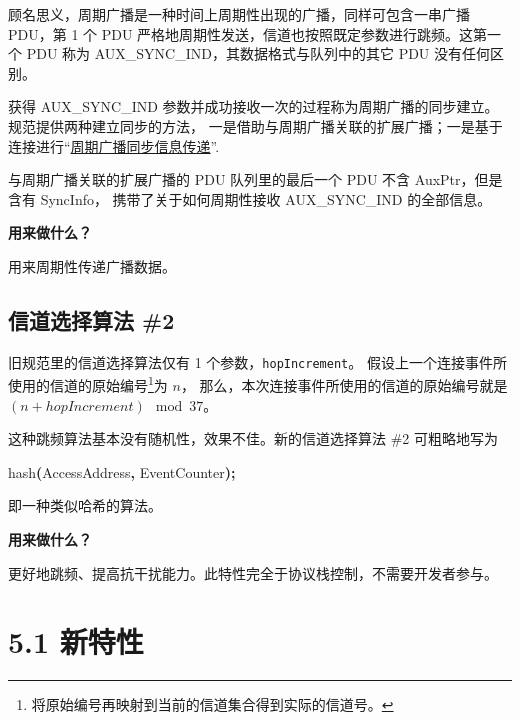 \documentclass[
  12pt,
]{book}
\makeatletter
\newenvironment{Shaded}{\begin{snugshade}}{\end{snugshade}}
\newcommand{\NormalTok}[1]{#1}
\newcommand{\OperatorTok}[1]{\textcolor[rgb]{0.81,0.36,0.00}{\textbf{#1}}}
\newenvironment{kframe}{%
\medskip{}
\setlength{\fboxsep}{.8em}
 \def\at@end@of@kframe{}%
 \ifinner\ifhmode%
  \def\at@end@of@kframe{\end{minipage}}%
  \begin{minipage}{\columnwidth}%
 \fi\fi%
 \def\FrameCommand##1{\hskip\@totalleftmargin \hskip-\fboxsep
 \colorbox{shadecolor}{##1}\hskip-\fboxsep
     \hskip-\linewidth \hskip-\@totalleftmargin \hskip\columnwidth}%
 \MakeFramed {\advance\hsize-\width
   \@totalleftmargin\z@ \linewidth\hsize
   \@setminipage}}%
 {\par\unskip\endMakeFramed%
 \at@end@of@kframe}
\newenvironment{rmdblock}[1]
  {
  \begin{itemize}
  \renewcommand{\labelitemi}{
    \raisebox{-.7\height}[0pt][0pt]{
      {\setkeys{Gin}{width=3em,keepaspectratio}\texttt{[image: images/\#1]}}
    }
  }
  \setlength{\fboxsep}{1em}
  \begin{kframe}
  \item
  }
  {
  \end{kframe}
  \end{itemize}
  }
\newenvironment{rmdnote}
  {\begin{rmdblock}{note}}
  {\end{rmdblock}}
\makeatother
\begin{document}
顾名思义，周期广播是一种时间上周期性出现的广播，同样可包含一串广播 PDU，第 1 个 PDU
严格地周期性发送，信道也按照既定参数进行跳频。这第一个 PDU 称为 AUX\_SYNC\_IND，其数据格式与队列中的其它
PDU 没有任何区别。

获得 AUX\_SYNC\_IND 参数并成功接收一次的过程称为周期广播的同步建立。规范提供两种建立同步的方法，
一是借助与周期广播关联的扩展广播；一是基于连接进行``\protect\hyperlink{ch-feature-prd-transfer}{周期广播同步信息传递}''.

与周期广播关联的扩展广播的 PDU 队列里的最后一个 PDU 不含 AuxPtr，但是含有 SyncInfo，
携带了关于如何周期性接收 AUX\_SYNC\_IND 的全部信息。

\begin{rmdnote}
\textbf{用来做什么？}

用来周期性传递广播数据。
\end{rmdnote}

\hypertarget{ux4fe1ux9053ux9009ux62e9ux7b97ux6cd5-2}{%
\subsection{信道选择算法 \#2}\label{ux4fe1ux9053ux9009ux62e9ux7b97ux6cd5-2}}

旧规范里的信道选择算法仅有 1 个参数，\texttt{hopIncrement}。
假设上一个连接事件所使用的信道的原始编号\footnote{将原始编号再映射到当前的信道集合得到实际的信道号。}为 \(n\)，
那么，本次连接事件所使用的信道的原始编号就是 \((n + \mathit{hopIncrement}) \mod 37\)。

这种跳频算法基本没有随机性，效果不佳。新的信道选择算法 \#2 可粗略地写为

\begin{Shaded}
\begin{Highlighting}[]
\NormalTok{hash}\OperatorTok{(}\NormalTok{AccessAddress}\OperatorTok{,}\NormalTok{ EventCounter}\OperatorTok{);}
\end{Highlighting}
\end{Shaded}

即一种类似哈希的算法。

\begin{rmdnote}
\textbf{用来做什么？}

更好地跳频、提高抗干扰能力。此特性完全于协议栈控制，不需要开发者参与。
\end{rmdnote}

\hypertarget{ux65b0ux7279ux6027-1}{%
\section{5.1 新特性}\label{ux65b0ux7279ux6027-1}}
\end{document}
